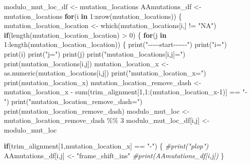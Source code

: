 \documentclass[
]{article}
\newenvironment{Shaded}{\begin{snugshade}}{\end{snugshade}}
\newcommand{\CommentTok}[1]{\textcolor[rgb]{0.56,0.35,0.01}{\textit{#1}}}
\newcommand{\ControlFlowTok}[1]{\textcolor[rgb]{0.13,0.29,0.53}{\textbf{#1}}}
\newcommand{\DecValTok}[1]{\textcolor[rgb]{0.00,0.00,0.81}{#1}}
\newcommand{\FunctionTok}[1]{\textcolor[rgb]{0.00,0.00,0.00}{#1}}
\newcommand{\NormalTok}[1]{#1}
\newcommand{\OtherTok}[1]{\textcolor[rgb]{0.56,0.35,0.01}{#1}}
\newcommand{\SpecialCharTok}[1]{\textcolor[rgb]{0.00,0.00,0.00}{#1}}
\newcommand{\StringTok}[1]{\textcolor[rgb]{0.31,0.60,0.02}{#1}}
\begin{document}
\begin{Shaded}
\begin{Highlighting}[]
\NormalTok{modulo\_mut\_loc\_df }\OtherTok{\textless{}{-}}\NormalTok{ mutation\_locations }
\NormalTok{AAmutations\_df }\OtherTok{\textless{}{-}}\NormalTok{ mutation\_locations}
\ControlFlowTok{for}\NormalTok{(i }\ControlFlowTok{in} \DecValTok{1}\SpecialCharTok{:}\FunctionTok{nrow}\NormalTok{(mutation\_locations))}
\NormalTok{\{}
\NormalTok{  mutation\_location\_location }\OtherTok{\textless{}{-}} \FunctionTok{which}\NormalTok{(mutation\_locations[i,] }\SpecialCharTok{!=} \StringTok{"NA"}\NormalTok{)}
  \ControlFlowTok{if}\NormalTok{(}\FunctionTok{length}\NormalTok{(mutation\_location\_location) }\SpecialCharTok{\textgreater{}} \DecValTok{0}\NormalTok{)}
\NormalTok{  \{}
    \ControlFlowTok{for}\NormalTok{(j }\ControlFlowTok{in} \DecValTok{1}\SpecialCharTok{:}\FunctionTok{length}\NormalTok{(mutation\_location\_location))}
\NormalTok{    \{}
      \FunctionTok{print}\NormalTok{(}\StringTok{"{-}{-}{-}{-}{-}start{-}{-}{-}{-}{-}{-}"}\NormalTok{)}
      \FunctionTok{print}\NormalTok{(}\StringTok{"i="}\NormalTok{)}
      \FunctionTok{print}\NormalTok{(i)}
      \FunctionTok{print}\NormalTok{(}\StringTok{"j="}\NormalTok{)}
      \FunctionTok{print}\NormalTok{(j)}
      \FunctionTok{print}\NormalTok{(}\StringTok{"mutation\_locations[i,j]="}\NormalTok{)}
      \FunctionTok{print}\NormalTok{(mutation\_locations[i,j])}
\NormalTok{      mutation\_location\_x }\OtherTok{\textless{}{-}} \FunctionTok{as.numeric}\NormalTok{(mutation\_locations[i,j]) }
      \FunctionTok{print}\NormalTok{(}\StringTok{"mutation\_location\_x="}\NormalTok{)}
      \FunctionTok{print}\NormalTok{(mutation\_location\_x)}
\NormalTok{      mutation\_location\_remove\_dash }\OtherTok{\textless{}{-}}\NormalTok{ mutation\_location\_x }\SpecialCharTok{{-}} \FunctionTok{sum}\NormalTok{(trim\_alignment[}\DecValTok{1}\NormalTok{,}\DecValTok{1}\SpecialCharTok{:}\NormalTok{(mutation\_location\_x}\DecValTok{{-}1}\NormalTok{)] }\SpecialCharTok{==} \StringTok{"{-}"}\NormalTok{)}
      \FunctionTok{print}\NormalTok{(}\StringTok{"mutation\_location\_remove\_dash="}\NormalTok{)}
      \FunctionTok{print}\NormalTok{(mutation\_location\_remove\_dash)}
\NormalTok{      modulo\_mut\_loc }\OtherTok{\textless{}{-}}\NormalTok{ mutation\_location\_remove\_dash }\SpecialCharTok{\%\%} \DecValTok{3}
\NormalTok{      modulo\_mut\_loc\_df[i,j] }\OtherTok{\textless{}{-}}\NormalTok{ modulo\_mut\_loc}
      
      \ControlFlowTok{if}\NormalTok{(trim\_alignment[}\DecValTok{1}\NormalTok{,mutation\_location\_x] }\SpecialCharTok{==} \StringTok{"{-}"}\NormalTok{)}
\NormalTok{      \{}
        \CommentTok{\#print("plop")}
\NormalTok{        AAmutations\_df[i,j] }\OtherTok{\textless{}{-}} \StringTok{"frame\_shift\_ins"}
        \CommentTok{\#print(AAmutations\_df[i,j])}
\NormalTok{      \}   }
      

\end{Highlighting}
\end{Shaded}
\end{document}
